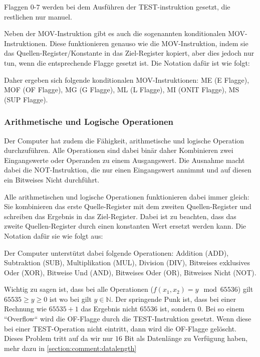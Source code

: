 \documentclass{scrartcl}
\begin{document}
Flaggen $0$-$7$ werden bei dem Ausführen der TEST-instruktion gesetzt, die restlichen nur manuel.

Neben der MOV-Instruktion gibt es auch die sogenannten konditionalen MOV-Instruktionen.
Diese funktionieren genauso wie die MOV-Instruktion, indem sie das Quellen-Register/Konstante in das Ziel-Register kopiert, aber dies jedoch nur tun, wenn die entsprechende Flagge gesetzt ist.
Die Notation dafür ist wie folgt:


Daher ergeben sich folgende konditionalen MOV-Instruktionen: ME (E Flagge), MOF (OF Flagge), MG (G Flagge), ML (L Flagge), MI (ONIT Flagge), MS (SUP Flagge).



\subsubsection{\label{section:arthimatik}Arithmetische und Logische Operationen}

Der Computer hat zudem die Fähigkeit, arithmetische und logische Operation durchzuführen.
Alle Operationen sind dabei binär daher Kombinieren zwei Eingangswerte oder Operanden zu einem Ausgangswert.
Die Ausnahme macht dabei die NOT-Instruktion, die nur einen Eingangswert annimmt und auf diesen ein Bitweises Nicht durchführt.

Alle arithmetischen und logische Operationen funktionieren dabei immer gleich:
Sie kombinieren das erste Quelle-Register mit dem zweiten Quellen-Register und schreiben das Ergebnis in das Ziel-Register.
Dabei ist zu beachten, dass das zweite Quellen-Register durch einen konstanten Wert ersetzt werden kann.
Die Notation dafür sie wie folgt aus:


Der Computer unterstützt dabei folgende Operationen:
Addition (ADD), Subtraktion (SUB), Multiplikation (MUL), Division (DIV), Bitweises exklusives Oder (XOR), Bitweise Und (AND), Bitweises Oder (OR), Bitweises Nicht (NOT).


Wichtig zu sagen ist, dass bei alle Operationen ($f(x_1, x_2) = y \mod 65536$) gilt $65535 \ge y \ge 0$ ist wo bei gilt $y \in \mathbb{N}$.
Der springende Punk ist, dass bei einer Rechnung wie $65535 + 1$ das Ergebnis nicht $65536$ ist, sondern $0$.
Bei so einem “Overflow“ wird die OF-Flagge durch die TEST-Instruktion gesetzt.
Wenn diese bei einer TEST-Operation nicht eintritt, dann wird die OF-Flagge gelöscht.
Dieses Problem tritt auf da wir nur $16$ Bit als Datenlänge zu Verfügung haben, mehr dazu in \autoref{section:comment:datalength}
\end{document}
